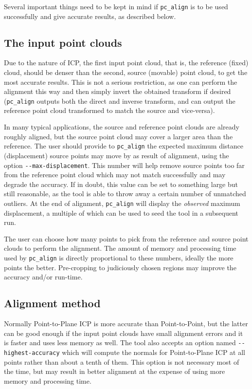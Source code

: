 Several important things need to be kept in mind if \texttt{pc\_align} is to be
used successfully and give accurate results, as described below.

\subsection{The input point clouds}

Due to the nature of ICP, the first input point cloud, that is, the
reference (fixed) cloud, should be denser than the second, source (movable)
point cloud, to get the most accurate results. This is not a serious
restriction, as one can perform the alignment this way and then simply
invert the obtained transform if desired (\texttt{pc\_align} outputs
both the direct and inverse transform, and can output the reference
point cloud transformed to match the source and vice-versa).

In many typical applications, the source and reference point clouds are
already roughly aligned, but the source point cloud may cover a larger
area than the reference. The user should provide to \texttt{pc\_align}
the expected maximum distance (displacement) source points may move by
as result of alignment, using the option
\texttt{-\/-max-displacement}. This number will help remove source
points too far from the reference point cloud which may not match
successfully and may degrade the accuracy. If in doubt, this value can
be set to something large but still reasonable, as the tool is able to
throw away a certain number of unmatched outliers. At the end of
alignment, \texttt{pc\_align} will display the {\it observed} maximum
displacement, a multiple of which can be used to seed the tool in a
subsequent run.

The user can choose how many points to pick from the reference and
source point clouds to perform the alignment. The amount of memory and
processing time used by \texttt{pc\_align} is directly proportional to
these numbers, ideally the more points the better. Pre-cropping to
judiciously chosen regions may improve the accuracy and/or run-time.

\subsection{Alignment method}
\label{align-method}

Normally Point-to-Plane ICP is more accurate than Point-to-Point, but
the latter can be good enough if the input point clouds have small
alignment errors and it is faster and uses less memory as well.  The
tool also accepts an option named \texttt{-\/-highest-accuracy} which
will compute the normals for Point-to-Plane ICP at all points rather
than about a tenth of them. This option is not necessary most of the
time, but may result in better alignment at the expense of using more
memory and processing time.

